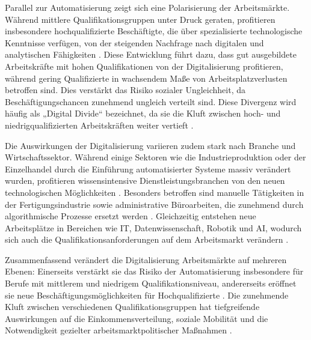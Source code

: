 Parallel zur Automatisierung zeigt sich eine Polarisierung der Arbeitsmärkte. Während 
mittlere Qualifikationsgruppen unter Druck geraten, profitieren insbesondere 
hochqualifizierte Beschäftigte, die über spezialisierte technologische Kenntnisse 
verfügen, von der steigenden Nachfrage nach digitalen und analytischen Fähigkeiten 
\parencite[vgl.][S. 2510]{goos2014explaining}. Diese Entwicklung führt dazu, dass gut 
ausgebildete Arbeitskräfte mit hohen Qualifikationen von der Digitalisierung profitieren, 
während gering Qualifizierte in wachsendem Maße von Arbeitsplatzverlusten betroffen sind. 
Dies verstärkt das Risiko sozialer Ungleichheit, da Beschäftigungschancen zunehmend 
ungleich verteilt sind. Diese Divergenz wird häufig als „Digital Divide“ bezeichnet, da 
sie die Kluft zwischen hoch- und niedrigqualifizierten Arbeitskräften weiter vertieft 
\parencite[vgl.][S. 10]{acemoglu2002technical}.

Die Auswirkungen der Digitalisierung variieren zudem stark nach Branche und
Wirtschaftssektor. Während einige Sektoren wie die Industrieproduktion oder der
Einzelhandel durch die Einführung automatisierter Systeme massiv verändert wurden,
profitieren wissensintensive Dienstleistungsbranchen von den neuen technologischen 
Möglichkeiten \parencite[vgl.][S. 1555]{autor2013thegrowth}. Besonders betroffen sind 
manuelle Tätigkeiten in der Fertigungsindustrie sowie administrative Büroarbeiten, die 
zunehmend durch algorithmische Prozesse ersetzt werden 
\parencite[vgl.][S. 260]{frey2013thefuture}. Gleichzeitig entstehen neue Arbeitsplätze in 
Bereichen wie IT, Datenwissenschaft, Robotik und \ac{AI}, wodurch sich auch die 
Qualifikationsanforderungen auf dem Arbeitsmarkt verändern 
\parencite[vgl.][S. 2510]{goos2014explaining}.

Zusammenfassend verändert die Digitalisierung Arbeitsmärkte auf mehreren Ebenen: 
Einerseits verstärkt sie das Risiko der Automatisierung insbesondere für Berufe mit 
mittlerem und niedrigem Qualifikationsniveau, andererseits eröffnet sie neue 
Beschäftigungsmöglichkeiten für Hochqualifizierte 
\parencite[vgl.][S. 1555]{autor2013thegrowth}. Die zunehmende Kluft zwischen verschiedenen 
Qualifikationsgruppen hat tiefgreifende Auswirkungen auf die Einkommensverteilung, soziale 
Mobilität und die Notwendigkeit gezielter arbeitsmarktpolitischer Maßnahmen 
\parencite[S. 2510]{goos2014explaining}.


